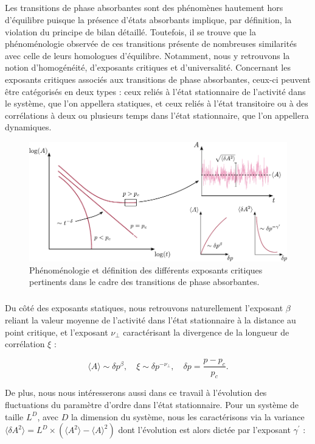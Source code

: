 \label{sec:tphiexp}

\subparagraph{}Les transitions de phase absorbantes sont des phénomènes hautement hors d'équilibre puisque la présence d'états absorbants implique, par définition, la violation du principe de bilan détaillé. Toutefois, il se trouve que la phénoménologie observée de ces transitions présente de nombreuses similarités avec celle de leurs homologues d'équilibre. Notamment, nous y retrouvons la notion d'homogénéité, d'exposants critiques et d'universalité. Concernant les exposants critiques associés aux transitions de phase absorbantes, ceux-ci peuvent être catégorisés en deux types : ceux reliés à l'état stationnaire de l'activité dans le système, que l'on appellera statiques, et ceux reliés à l'état transitoire ou à des corrélations à deux ou plusieurs temps dans l'état stationnaire, que l'on appellera dynamiques.

\begin{figure}[h]
	\centering
	\includegraphics[width=\textwidth]{Chapitre1/Figures/TphiAbs/expabs.pdf}
	\caption{Phénoménologie et définition des différents exposants critiques pertinents dans le cadre des transitions de phase absorbantes.}
	\label{fig:expabs}
\end{figure}

\subparagraph{}Du côté des exposants statiques, nous retrouvons naturellement l'exposant $\beta$ reliant la valeur moyenne de l'activité dans l'état stationnaire à la distance au point critique, et l'exposant $\nu_\perp$ caractérisant la divergence de la longueur de corrélation $\xi$ :

\begin{equation}
	\langle A \rangle \sim \delta p^\beta, \quad \xi \sim \delta p^{-\nu_\perp}, \quad \delta p =  \frac{p-p_c}{p_c}.
\end{equation}

\noindent De plus, nous nous intéresserons aussi dans ce travail à l'évolution des fluctuations du paramètre d'ordre dans l'état stationnaire. Pour un système de taille $L^D$, avec $D$ la dimension du système, nous les caractérisons via la variance $\langle \delta A^2\rangle  = L^D\times(\langle A ^2 \rangle - \langle A \rangle^2)$ dont l'évolution est alors dictée par l'exposant $\gamma^\prime$ :


